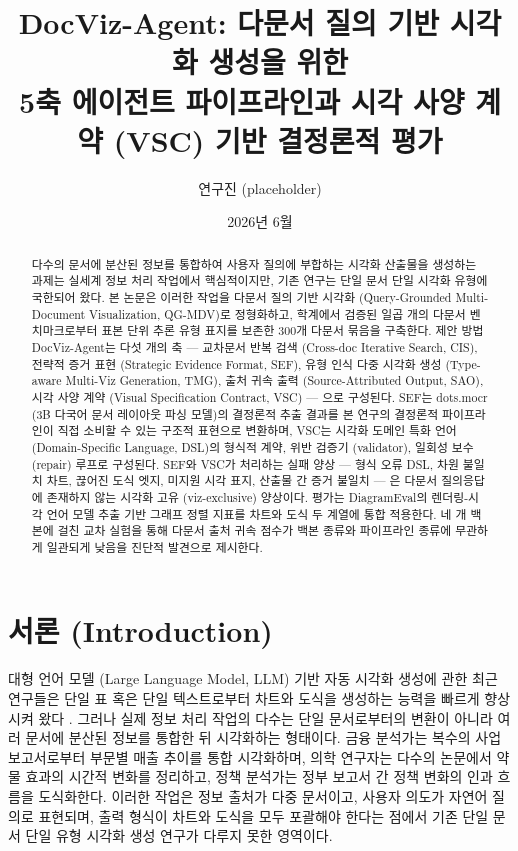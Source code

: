 \documentclass[11pt]{article}
\title{DocViz-Agent: 다문서 질의 기반 시각화 생성을 위한 \\
       5축 에이전트 파이프라인과 시각 사양 계약 (VSC) 기반 결정론적 평가}
\author{연구진 (placeholder)}
\date{2026년 6월}
\begin{document}
\maketitle

\begin{abstract}
다수의 문서에 분산된 정보를 통합하여 사용자 질의에 부합하는 시각화 산출물을 생성하는 과제는 실세계 정보 처리 작업에서 핵심적이지만, 기존 연구는 단일 문서 단일 시각화 유형에 국한되어 왔다. 본 논문은 이러한 작업을 다문서 질의 기반 시각화 (Query-Grounded Multi-Document Visualization, QG-MDV)로 정형화하고, 학계에서 검증된 일곱 개의 다문서 벤치마크로부터 표본 단위 추론 유형 표지를 보존한 300개 다문서 묶음을 구축한다. 제안 방법 DocViz-Agent는 다섯 개의 축 — 교차문서 반복 검색 (Cross-doc Iterative Search, CIS), 전략적 증거 표현 (Strategic Evidence Format, SEF), 유형 인식 다중 시각화 생성 (Type-aware Multi-Viz Generation, TMG), 출처 귀속 출력 (Source-Attributed Output, SAO), 시각 사양 계약 (Visual Specification Contract, VSC) — 으로 구성된다. SEF는 dots.mocr (3B 다국어 문서 레이아웃 파싱 모델)의 결정론적 추출 결과를 본 연구의 결정론적 파이프라인이 직접 소비할 수 있는 구조적 표현으로 변환하며, VSC는 시각화 도메인 특화 언어 (Domain-Specific Language, DSL)의 형식적 계약, 위반 검증기 (validator), 일회성 보수 (repair) 루프로 구성된다. SEF와 VSC가 처리하는 실패 양상 — 형식 오류 DSL, 차원 불일치 차트, 끊어진 도식 엣지, 미지원 시각 표지, 산출물 간 증거 불일치 — 은 다문서 질의응답에 존재하지 않는 시각화 고유 (viz-exclusive) 양상이다. 평가는 DiagramEval의 렌더링-시각 언어 모델 추출 기반 그래프 정렬 지표를 차트와 도식 두 계열에 통합 적용한다. 네 개 백본에 걸친 교차 실험을 통해 다문서 출처 귀속 점수가 백본 종류와 파이프라인 종류에 무관하게 일관되게 낮음을 진단적 발견으로 제시한다.
\end{abstract}

\section{서론 (Introduction)}

대형 언어 모델 (Large Language Model, LLM) 기반 자동 시각화 생성에 관한 최근 연구들은 단일 표 혹은 단일 텍스트로부터 차트와 도식을 생성하는 능력을 빠르게 향상시켜 왔다 \cite{han2023chartllama,yang2024chartmimic}. 그러나 실제 정보 처리 작업의 다수는 단일 문서로부터의 변환이 아니라 여러 문서에 분산된 정보를 통합한 뒤 시각화하는 형태이다. 금융 분석가는 복수의 사업보고서로부터 부문별 매출 추이를 통합 시각화하며, 의학 연구자는 다수의 논문에서 약물 효과의 시간적 변화를 정리하고, 정책 분석가는 정부 보고서 간 정책 변화의 인과 흐름을 도식화한다. 이러한 작업은 정보 출처가 다중 문서이고, 사용자 의도가 자연어 질의로 표현되며, 출력 형식이 차트와 도식을 모두 포괄해야 한다는 점에서 기존 단일 문서 단일 유형 시각화 생성 연구가 다루지 못한 영역이다.
\end{document}
